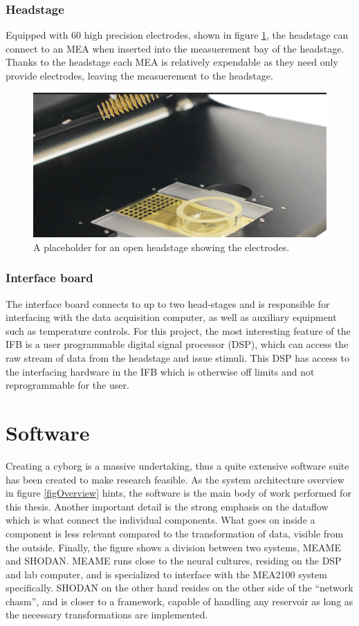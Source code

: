 \subsubsection{Headstage}
Equipped with 60 high precision electrodes, shown in figure \ref{openHeadstage}, the
headstage can connect to an MEA when inserted into the measuerement bay of the
headstage.
Thanks to the headstage each MEA is relatively expendable as they need only
provide electrodes, leaving the measuerement to the headstage.
\begin{figure}[h!]
  \centering
  \includegraphics[width=1\textwidth]{fig/hs_placeholder.png}
  \caption{
    A placeholder for an open headstage showing the electrodes.
  }
  \label{openHeadstage}
\end{figure}
\subsubsection{Interface board}
The interface board connects to up to two head-stages and is responsible for
interfacing with the data acquisition computer, as well as auxiliary equipment
such as temperature controls.
For this project, the most interesting feature of the IFB is a user programmable
digital signal processor (DSP), which can access the raw stream of data from the
headstage and issue stimuli.
This DSP has access to the interfacing hardware in the IFB which is otherwise
off limits and not reprogrammable for the user.
\section{Software}
Creating a cyborg is a massive undertaking, thus a quite extensive software
suite has been created to make research feasible.
As the system architecture overview in figure \ref{figOverview} hints, the software is the
main body of work performed for this thesis.
Another important detail is the strong emphasis on the dataflow which is what
connect the individual components.
What goes on inside a component is less relevant compared to the transformation
of data, visible from the outside.
Finally, the figure shows a division between two systems, MEAME and SHODAN.
MEAME runs close to the neural cultures, residing on the DSP and lab computer,
and is specialized to interface with the MEA2100 system specifically.
SHODAN on the other hand resides on the other side of the ``network chasm'', and
is closer to a framework, capable of handling any reservoir as long as the
necessary transformations are implemented.
